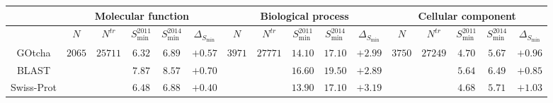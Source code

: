 \begin{tabular}{c|ccccc|ccccc|ccccc}
\hline
& \multicolumn{5}{c|}{Molecular function}
& \multicolumn{5}{c}{Biological process}
& \multicolumn{5}{|c}{Cellular component} \\ \hline \hline
&
$N$ & $N^{tr}$ & $S_{\min}^{2011}$ & $S_{\min}^{2014}$ & $\Delta_{S_{\min}}$ &
$N$ & $N^{tr}$ & $S_{\min}^{2011}$ & $S_{\min}^{2014}$ & $\Delta_{S_{\min}}$ &
$N$ & $N^{tr}$ & $S_{\min}^{2011}$ & $S_{\min}^{2014}$ & $\Delta_{S_{\min}}$ \\ \hline 
GOtcha &
\multirow{3}{*}{$2065$} & \multirow{3}{*}{$25711$} & $6.32$ & $6.89$ & $+0.57$ &
\multirow{3}{*}{$3971$} & \multirow{3}{*}{$27771$} & $14.10$ & $17.10$ & $+2.99$ &
\multirow{3}{*}{$3750$} & \multirow{3}{*}{$27249$} & $4.70$ & $5.67$ & $+0.96$ \\
BLAST &
& & $7.87$ & $8.57$ & $+0.70$ &
& & $16.60$ & $19.50$ & $+2.89$ &
& & $5.64$ & $6.49$ & $+0.85$ \\
Swiss-Prot &
& & $6.48$ & $6.88$ & $+0.40$ &
& & $13.90$ & $17.10$ & $+3.19$ &
& & $4.68$ & $5.71$ & $+1.03$ \\
\hline
\end{tabular}
